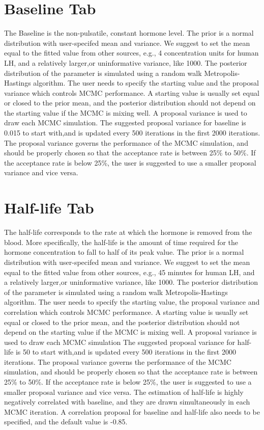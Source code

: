 \documentclass[11pt]{book}
\begin{document}
\section{Baseline Tab}
The Baseline is the non-pulsatile, constant hormone level. The prior is a normal distribution with user-specifed mean and variance. We suggest to set the mean equal to the fitted value from other sources, e.g., 4 concentration units for  human LH, and a relatively larger,or uninformative variance, like 1000. The posterior distribution of the parameter is simulated using a random walk Metropolis-Hastings algorithm. The user needs to specify the starting value and the proposal variance which controls MCMC performance. A starting value is usually set equal or closed to the prior mean, and the posterior distribution should not depend on the starting value if the MCMC is mixing well.  A proposal variance is used to draw each MCMC simulation. The suggested proposal variance for baseline is 0.015 to start with,and is updated every 500 iterations in the first 2000 iterations. The proposal variance governs the performance of the MCMC simulation, and should be properly chosen so that the acceptance rate is between 25\% to 50\%. If the acceptance rate is below 25\%, the user is suggested to use a smaller proposal variance and vice versa.
\section{Half-life Tab}
The half-life corresponds to the rate at which the hormone is removed from the blood. More specifically, the half-life is the amount of time required for the hormone concentration to fall to half of its peak value. The prior is a normal distribution with user-specifed mean and variance. We suggest to set the mean equal to the fitted value from other sources, e.g., 45 minutes for  human LH, and a relatively larger,or uninformative variance, like 1000. The posterior distribution of the parameter is simulated using a random walk Metropolis-Hastings algorithm. The user needs to specify the starting value, the proposal variance and correlation which controls MCMC performance. A starting value is usually set equal or closed to the prior mean, and the posterior distribution should not depend on the starting value if the MCMC is mixing well. A proposal variance is used to draw each MCMC simulation The suggested proposal variance for half-life is 50 to start with,and is updated every 500 iterations in the first 2000 iterations. The proposal variance governs the performance of the MCMC simulation, and should be properly chosen so that the acceptance rate is between 25\% to 50\%. If the acceptance rate is below 25\%, the user is suggested to use a smaller proposal variance and vice versa. The estimation of half-life is highly negatively correlated with baseline, and they are drawn simultaneously in each MCMC iteration. A correlation proposal for baseline and half-life also needs to be specified, and the default value is -0.85.
\end{document}
